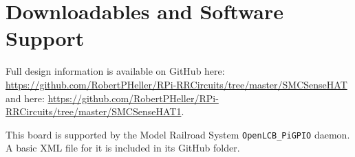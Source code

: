 \section{Downloadables and Software Support}

Full design information is available on GitHub here: 
\url{https://github.com/RobertPHeller/RPi-RRCircuits/tree/master/SMCSenseHAT} 
and here:
\url{https://github.com/RobertPHeller/RPi-RRCircuits/tree/master/SMCSenseHAT1}.

This board is supported by the Model Railroad System
\texttt{OpenLCB\_PiGPIO} daemon. A basic XML file for it is included in its
GitHub folder.

